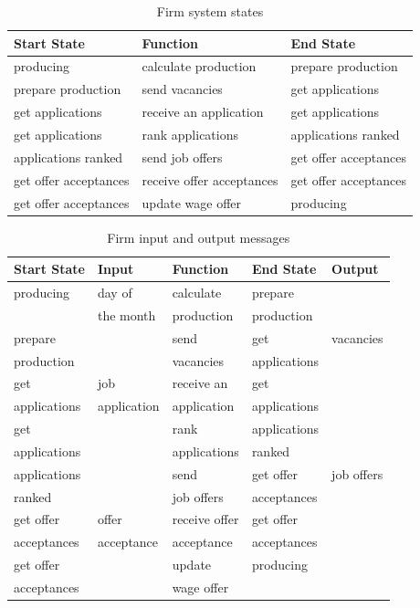 \documentclass[a4paper,11pt]{article}
\begin{document}
\begin{table}[tbp]
\centering
\begin{tabular}{|l||l||l|}
\hline
Start State&Function&End State\\
\hline \hline
producing&calculate production&prepare production\\
\hline
prepare production&send vacancies&get applications\\
\hline
get applications&receive an application&get applications\\
\hline
get applications&rank applications&applications ranked\\
\hline
applications ranked&send job offers&get offer acceptances\\
\hline
get offer acceptances&receive offer acceptances&get offer acceptances\\
\hline
get offer acceptances&update wage offer&producing\\
\hline
\end{tabular}
\caption{Firm system states} \label{tab:firmstates}
\end{table}

\begin{table}[tbp]
\centering
\begin{tabular}{|l|l||l||l|l|}
\hline
Start State&Input&Function&End State&Output\\
\hline \hline
producing&day of&calculate&prepare&\\
&the month&production&production&\\
\hline
prepare&&send&get&vacancies\\
production&&vacancies&applications&\\
\hline
get&job&receive an&get&\\
applications&application&application&applications&\\
\hline
get&&rank&applications&\\
applications&&applications&ranked&\\
\hline
applications&&send&get offer&job offers\\
ranked&&job offers&acceptances&\\
\hline
get offer&offer&receive offer&get offer&\\
acceptances&acceptance&acceptance&acceptances&\\
\hline
get offer&&update&producing&\\
acceptances&&wage offer&&\\
\hline
\end{tabular}
\caption{Firm input and output messages} \label{tab:firmmessages}
\end{table}
\end{document}
